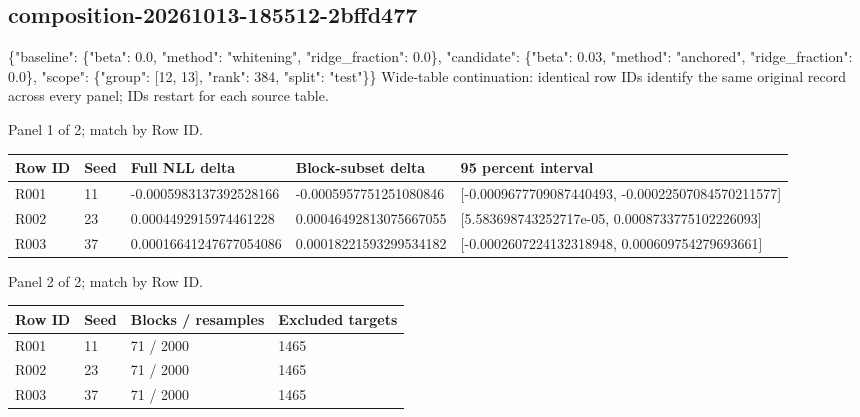 \documentclass[10pt]{article}
\begin{document}
\subsection{composition-20261013-185512-2bffd477}
\{"baseline": \{"beta": 0.0, "method": "whitening", "ridge\_fraction": 0.0\}, "candidate": \{"beta": 0.03, "method": "anchored", "ridge\_fraction": 0.0\}, "scope": \{"group": [12, 13], "rank": 384, "split": "test"\}\}
Wide-table continuation: identical row IDs identify the same original record across every panel; IDs restart for each source table.
\par\noindent Panel 1 of 2; match by Row ID.
{\scriptsize\setlength{\tabcolsep}{2pt}
\begin{longtable}{p{}p{}p{}p{}p{}}
Row ID & Seed & Full NLL delta & Block-subset delta & 95 percent interval \\
\hline\endhead
R001 & 11 & -0.0005983137392528166 & -0.0005957751251080846 & [-0.0009677709087440493, -0.00022507084570211577] \\
R002 & 23 & 0.0004492915974461228 & 0.00046492813075667055 & [5.583698743252717e-05, 0.0008733775102226093] \\
R003 & 37 & 0.00016641247677054086 & 0.00018221593299534182 & [-0.0002607224132318948, 0.000609754279693661] \\
\end{longtable}}
\par\noindent Panel 2 of 2; match by Row ID.
{\scriptsize\setlength{\tabcolsep}{2pt}
\begin{longtable}{p{}p{}p{}p{}}
Row ID & Seed & Blocks / resamples & Excluded targets \\
\hline\endhead
R001 & 11 & 71 / 2000 & 1465 \\
R002 & 23 & 71 / 2000 & 1465 \\
R003 & 37 & 71 / 2000 & 1465 \\
\end{longtable}}
\end{document}
